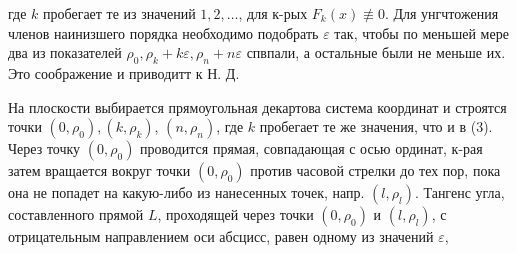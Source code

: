\documentclass[10pt]{article}
\begin{document}
где $k$ пробегает те из значений $1,2, \ldots$, для к-рых $F_{k}(x) \not \equiv 0$. Для унгчтожения членов наинизшего порядка необходимо подобрать $\varepsilon$ так, чтобы по меньшей мере два из показателей $\rho_{0}, \rho_{k}+k \varepsilon, \rho_{n}+n \varepsilon$ спвпали, а остальные были не меньше их. Это соображение и приводитт к Н. Д.



На плоскости выбирается прямоугольная декартова система координат и строятся точки $\left(0, \rho_{0}\right),\left(k, \rho_{k}\right)$, $\left(n, \rho_{n}\right)$, где $k$ пробегает те же значения, что и в (3). Через точку $\left(0, \rho_{0}\right)$ проводится прямая, совпадающая с осью ординат, к-рая затем вращается вокруг точки $\left(0, \rho_{0}\right)$ против часовой стрелки до тех пор, пока она не попадет на какую-либо из нанесенных точек, напр. $\left(l, \rho_{l}\right)$. Тангенс угла, составленного прямой $L$, проходящей через точки $\left(0, \rho_{0}\right)$ и $\left(l, \rho_{l}\right)$, с отрицательным направлением оси абсцисс, равен одному из значений $\varepsilon$,
\end{document}
